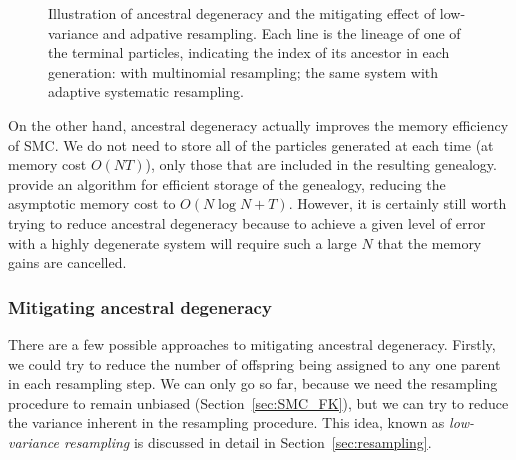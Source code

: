 \begin{figure}[ht]
\centering
{}
\caption[Ancestral degeneracy]{Illustration of ancestral degeneracy and the mitigating effect of low-variance and adpative resampling.
Each line is the lineage of one of the terminal particles, indicating the index of its ancestor in each generation:
 with multinomial resampling;
 the same system with adaptive systematic resampling.}
\label{fig:ancestral_degeneracy}
\end{figure}
On the other hand, ancestral degeneracy actually improves the memory efficiency of SMC. We do not need to store all of the particles generated at each time (at memory cost $O(NT)$), only those that are included in the resulting genealogy. \textcite{jacob2015} provide an algorithm for efficient storage of the genealogy, reducing the asymptotic memory cost to $O(N\log N+T)$.
However, it is certainly still worth trying to reduce ancestral degeneracy because to achieve a given level of error with a highly degenerate system will require such a large $N$ that the memory gains are cancelled.


\subsubsection{Mitigating ancestral degeneracy}
There are a few possible approaches to mitigating ancestral degeneracy.
Firstly, we could try to reduce the number of offspring being assigned to any one parent in each resampling step. We can only go so far, because we need the resampling procedure to remain unbiased (Section~\ref{sec:SMC_FK}), but we can try to reduce the variance inherent in the resampling procedure. This idea, known as \emph{low-variance resampling}\seb{[citation?]} is discussed in detail in Section~\ref{sec:resampling}.

